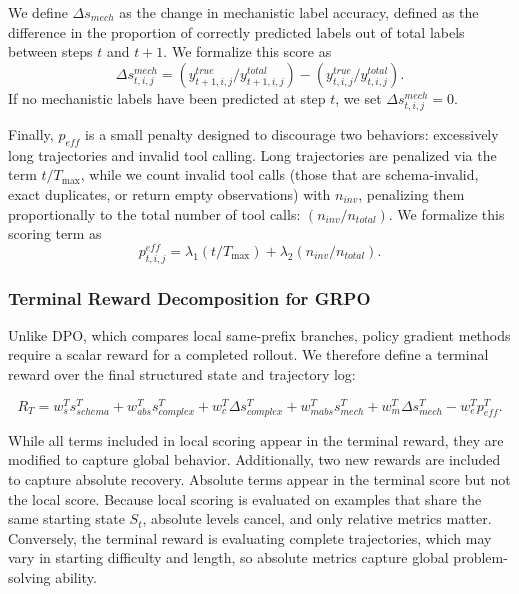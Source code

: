 \documentclass[thesis,letterpaper,12pt]{utthesis}
\begin{document}
We define $\Delta s_{mech}$ as the change in mechanistic label accuracy, defined as the difference in the proportion of correctly predicted labels out of total labels between steps $t$ and $t+1$. We formalize this score as
\begin{equation}\label{eqn:mech-score}
   \Delta s^{mech}_{t,i,j} = (y^{true}_{t+1,i,j} / y^{total}_{t+1,i,j}) - (y^{true}_{t,i,j} / y^{total}_{t,i,j}).
\end{equation}
If no mechanistic labels have been predicted at step $t$, we set $\Delta s^{mech}_{t,i,j} = 0$.

Finally, $p_{eff}$ is a small penalty designed to discourage two behaviors: excessively long trajectories and invalid tool calling. Long trajectories are penalized via the term $t / T_{\max}$, while we count invalid tool calls (those that are schema-invalid, exact duplicates, or return empty observations) with $n_{inv}$, penalizing them proportionally to the total number of tool calls: $(n_{inv} / n_{total})$. We formalize this scoring term as
\begin{equation}\label{eqn:eff-pen}
    p^{eff}_{t,i,j} = \lambda_1 (t / T_{\max}) + \lambda_2(n_{inv} / n_{total}).
\end{equation}

\subsubsection{Terminal Reward Decomposition for GRPO}\label{sec:terminal-reward}
Unlike DPO, which compares local same-prefix branches, policy gradient methods require a scalar reward for a completed rollout. We therefore define a terminal reward over the final structured state and trajectory log:

\begin{equation}\label{eqn:terminal-reward}
    R_T = w^T_s s^T_{schema} +w^T_{abs} s^{T}_{complex} + w^T_{c} \Delta s^{T}_{complex} + w^T_{mabs} s^T_{mech} + w^T_{m} \Delta s^{T}_{mech} - w^T_e p^{T}_{eff}. 
\end{equation}

While all terms included in local scoring appear in the terminal reward, they are modified to capture global behavior. Additionally, two new rewards are included to capture absolute recovery. Absolute terms appear in the terminal score but not the local score. Because local scoring is evaluated on examples that share the same starting state $S_t$, absolute levels cancel, and only relative metrics matter. Conversely, the terminal reward is evaluating complete trajectories, which may vary in starting difficulty and length, so absolute metrics capture global problem-solving ability.
\end{document}
